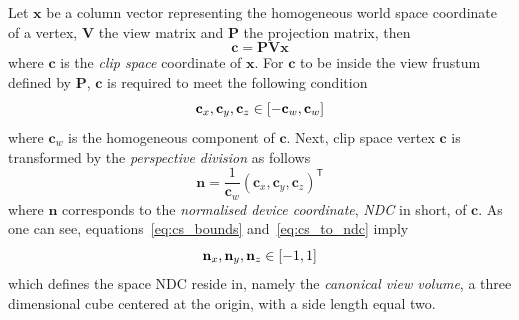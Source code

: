 
\newcommand{\mvec}[1]{\mathbf{#1}}
\newcommand{\mvecx}[1]{\mathbf{#1}_x}
\newcommand{\mvecy}[1]{\mathbf{#1}_y}
\newcommand{\mvecz}[1]{\mathbf{#1}_z}
\newcommand{\mvecw}[1]{\mathbf{#1}_w}
\newcommand{\mmat}[1]{\mathbf{#1}}

Let $\mvec{x}$ be a column vector representing the homogeneous world space
coordinate of a vertex, $\mmat{V}$ the view matrix and $\mmat{P}$ the
projection matrix, then
\begin{equation}
\label{eq:ws_to_cs}
 \mvec{c} = \mmat{P} \mmat{V} \mvec{x}
\end{equation}
where $\mvec{c}$ is the \textit{clip space} coordinate of $\mvec{x}$. For $\mvec{c}$ to
be inside the view frustum defined by $\mmat{P}$, $\mvec{c}$ is required to
meet the following condition
\begin{equation}
\label{eq:cs_bounds}
 \mvecx{c}, \mvecy{c}, \mvecz{c} \in \interval{-\mvecw{c}}{\mvecw{c}}
\end{equation}
where $\mvecw{c}$ is the homogeneous component of $\mvec{c}$. Next, clip space
vertex $\mvec{c}$ is transformed by the \textit{perspective division} as follows
\begin{equation}
\label{eq:cs_to_ndc}
 \mvec{n} = \frac{1}{\mvecw{c}}(\mvecx{c}, \mvecy{c}, \mvecz{c})^\mathsf{T}
\end{equation}
where $\mvec{n}$ corresponds to the \textit{normalised device coordinate},
\textit{NDC} in short, of $\mvec{c}$. As one can see, equations~\ref{eq:cs_bounds}
and~\ref{eq:cs_to_ndc} imply
\begin{equation}
\label{eq:ndc_bounds}
 \mvecx{n}, \mvecy{n}, \mvecz{n} \in \interval{-1}{1}
\end{equation}
which defines the space NDC reside in, namely the \textit{canonical view volume},
a three dimensional cube centered at the origin, with a side length equal two.\\


